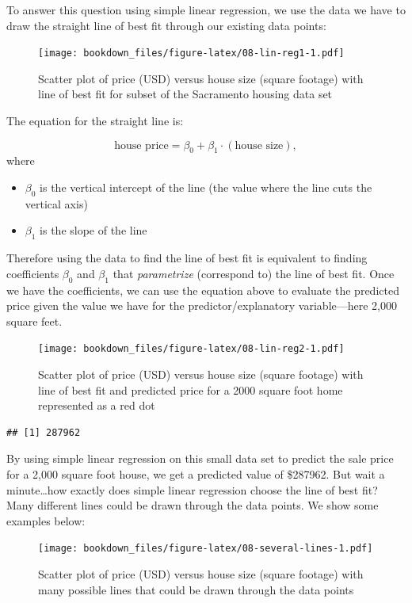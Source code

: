\documentclass[
]{krantz}
\providecommand{\tightlist}{%
  \setlength{\itemsep}{0pt}\setlength{\parskip}{0pt}}
\begin{document}
To answer this question using simple linear regression, we use the data we have
to draw the straight line of best fit through our existing data points:

\begin{figure}
\centering
\texttt{[image: bookdown\_files/figure-latex/08-lin-reg1-1.pdf]}
\caption{\label{fig:08-lin-reg1}Scatter plot of price (USD) versus house size (square footage) with line of best fit for subset of the Sacramento housing data set}
\end{figure}

The equation for the straight line is:

\[\text{house price} = \beta_0 + \beta_1 \cdot (\text{house size}),\]
where

\begin{itemize}
\tightlist
\item
  \(\beta_0\) is the vertical intercept of the line (the value where the line cuts the vertical axis)
\item
  \(\beta_1\) is the slope of the line
\end{itemize}

Therefore using the data to find the line of best fit is equivalent to finding coefficients
\(\beta_0\) and \(\beta_1\) that \emph{parametrize} (correspond to) the line of best fit.
Once we have the coefficients, we can use the equation above to evaluate the predicted price given the value we
have for the predictor/explanatory variable---here 2,000 square feet.

\begin{figure}
\centering
\texttt{[image: bookdown\_files/figure-latex/08-lin-reg2-1.pdf]}
\caption{\label{fig:08-lin-reg2}Scatter plot of price (USD) versus house size (square footage) with line of best fit and predicted price for a 2000 square foot home represented as a red dot}
\end{figure}

\begin{verbatim}
## [1] 287962
\end{verbatim}

By using simple linear regression on this small data set to predict the sale price
for a 2,000 square foot house, we get a predicted value of
\$287962. But wait a minute\ldots how
exactly does simple linear regression choose the line of best fit? Many
different lines could be drawn through the data points. We show some examples
below:

\begin{figure}
\centering
\texttt{[image: bookdown\_files/figure-latex/08-several-lines-1.pdf]}
\caption{\label{fig:08-several-lines}Scatter plot of price (USD) versus house size (square footage) with many possible lines that could be drawn through the data points}
\end{figure}
\end{document}
